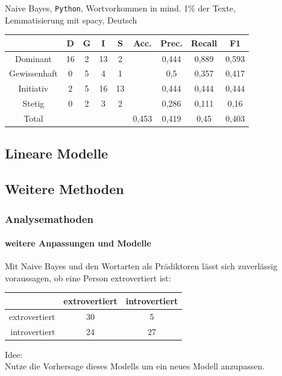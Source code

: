 \documentclass{beamer}
\begin{document}
\begin{frame}
\begin{center}
Naive Bayes, \texttt{Python}, Wortvorkommen in mind. 1\% der Texte,\\
Lemmatisierung mit spacy, Deutsch\
\begin{tabular}{|c|c|c|c|c|c|c|c|c|}
\hline
 & D 	& G	& I & S	& Acc.	& Prec. & Recall	& F1\\
\hline
Dominant & 16 & 2 & 13 & 2 & & 0,444 & 0,889 & 0,593\\
Gewissenhaft & 0 & 5 & 4 & 1 & & 0,5 & 0,357 & 0,417\\
Initiativ & 2 & 5 & 16 & 13& & 0,444 & 0,444 & 0,444\\
Stetig & 0 & 2 & 3 & 2& & 0,286 & 0,111 & 0,16 \\
\hline
Total  &   &   &   &   & 0,453 & 0,419  & 0,45   & 0,403\\
\hline
\end{tabular}
\end{center}
\end{frame}

\subsection{Lineare Modelle}

\subsection{Weitere Methoden}
\begin{frame}
 \frametitle{Analysemathoden}
 \framesubtitle{weitere Anpassungen und Modelle}
 Mit Naive Bayes und den Wortarten als Prädiktoren lässt sich zuverlässig voraussagen,
 ob eine Person extrovertiert ist:\\
 \vspace{12pt}
 \begin{center}
 \begin{tabular}{r|c|c|}
  &  extrovertiert  & introvertiert \\
  \hline
  extrovertiert & 30 & 5  \\
  introvertiert & 24 & 27 \\
 \end{tabular} 
 \end{center}

 \vspace{12pt}
 
 Idee:\\
 Nutze die Vorhersage dieses Modells um ein neues Modell anzupassen.
\end{frame}
\end{document}
